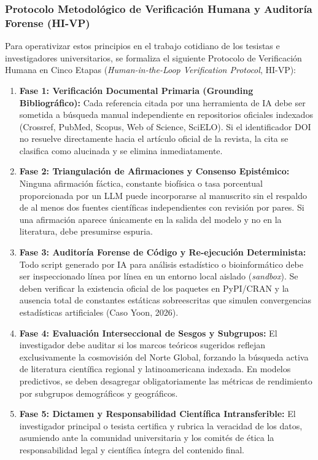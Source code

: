 \subsubsection{Protocolo Metodológico de Verificación Humana y Auditoría Forense (HI-VP)}

Para operativizar estos principios en el trabajo cotidiano de los tesistas e investigadores universitarios, se formaliza el siguiente Protocolo de Verificación Humana en Cinco Etapas (\textit{Human-in-the-Loop Verification Protocol}, HI-VP):

\begin{enumerate}
    \item \textbf{Fase 1: Verificación Documental Primaria (Grounding Bibliográfico):} Cada referencia citada por una herramienta de IA debe ser sometida a búsqueda manual independiente en repositorios oficiales indexados (Crossref, PubMed, Scopus, Web of Science, SciELO). Si el identificador DOI no resuelve directamente hacia el artículo oficial de la revista, la cita se clasifica como alucinada y se elimina inmediatamente.
    \item \textbf{Fase 2: Triangulación de Afirmaciones y Consenso Epistémico:} Ninguna afirmación fáctica, constante biofísica o tasa porcentual proporcionada por un LLM puede incorporarse al manuscrito sin el respaldo de al menos dos fuentes científicas independientes con revisión por pares. Si una afirmación aparece únicamente en la salida del modelo y no en la literatura, debe presumirse espuria.
    \item \textbf{Fase 3: Auditoría Forense de Código y Re-ejecución Determinista:} Todo script generado por IA para análisis estadístico o bioinformático debe ser inspeccionado línea por línea en un entorno local aislado (\textit{sandbox}). Se deben verificar la existencia oficial de los paquetes en PyPI/CRAN y la ausencia total de constantes estáticas sobreescritas que simulen convergencias estadísticas artificiales (Caso Yoon, 2026).
    \item \textbf{Fase 4: Evaluación Interseccional de Sesgos y Subgrupos:} El investigador debe auditar si los marcos teóricos sugeridos reflejan exclusivamente la cosmovisión del Norte Global, forzando la búsqueda activa de literatura científica regional y latinoamericana indexada. En modelos predictivos, se deben desagregar obligatoriamente las métricas de rendimiento por subgrupos demográficos y geográficos.
    \item \textbf{Fase 5: Dictamen y Responsabilidad Científica Intransferible:} El investigador principal o tesista certifica y rubrica la veracidad de los datos, asumiendo ante la comunidad universitaria y los comités de ética la responsabilidad legal y científica íntegra del contenido final.
\end{enumerate}

